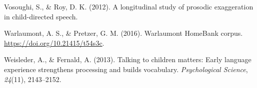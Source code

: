 \documentclass[10pt, letterpaper]{article}
\newenvironment{CSLReferences}%
  {}%
  {\par}
\begin{document}
\begin{CSLReferences}{1}{0}
\leavevmode\hypertarget{ref-vosoughi2012longitudinal}{}%
Vosoughi, S., \& Roy, D. K. (2012). A longitudinal study of prosodic
exaggeration in child-directed speech.

\leavevmode\hypertarget{ref-warlaumontcorpus}{}%
Warlaumont, A. S., \& Pretzer, G. M. (2016). Warlaumont HomeBank corpus.
\url{https://doi.org/10.21415/t54s3c}.

\leavevmode\hypertarget{ref-weisleder2013talking}{}%
Weisleder, A., \& Fernald, A. (2013). Talking to children matters: Early
language experience strengthens processing and builds vocabulary.
\emph{Psychological Science}, \emph{24}(11), 2143--2152.

\end{CSLReferences}


\end{document}
